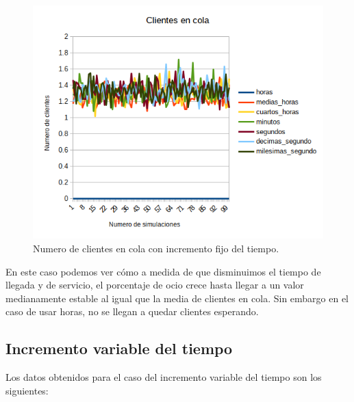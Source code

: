 \documentclass[11pt,a4paper]{report}
\begin{document}
\begin{figure}[H]
    \includegraphics[width=\textwidth]{img/cap-1/tiempo_medio_en_cola_fijo.png}
  	\caption{Numero de clientes en cola con incremento fijo del tiempo.}
\end{figure}

En este caso podemos ver cómo a medida de que disminuimos el tiempo de llegada y de servicio, el porcentaje de ocio crece hasta llegar a un valor medianamente estable al igual que la media de clientes en cola. Sin embargo en el caso de usar horas, no se llegan a quedar clientes esperando. 

\newpage
\subsection{Incremento variable del tiempo}

Los datos obtenidos para el caso del incremento variable del tiempo son los siguientes:
\end{document}
